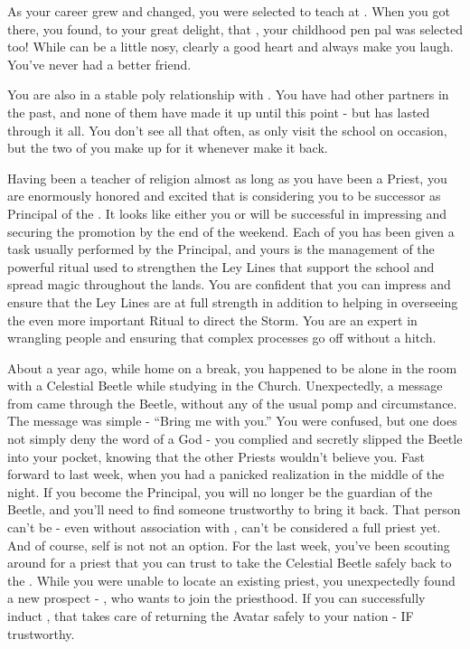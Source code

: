 \documentclass[char]{GL2020}
\begin{document}
As your career grew and changed, you were selected to teach at \pSchool{}. When you got there, you found, to your great delight, that \cMusic{}, your childhood pen pal was selected too! While \cMusic{} can be a little nosy, \cMusic{\they} clearly \cMusic{\have} a good heart and always make you laugh. You’ve never had a better friend.

You are also in a stable poly relationship with \cJuniorStatesman{}. You have had other partners in the past, and none of them have made it up until this point - but \cJuniorStatesman{} has lasted through it all. You don’t see \cJuniorStatesman{\them} all that often, as \cJuniorStatesman{\they} only visit \cJuniorStatesman{\plural} the school on occasion, but the two of you make up for it whenever \cJuniorStatesman{\they} \cJuniorStatesman{\does} make it back.

Having been a teacher of religion almost as long as you have been a Priest, you are enormously honored and excited that \cPrincipal{} is considering you to be \cPrincipal{\their} successor as Principal of the \pSchool{}.  It looks like either you or \cMusic{} will be successful in impressing \cPrincipal{} and securing the promotion by the end of the weekend.  Each of you has been given a task usually performed by the Principal, and yours is the management of the powerful ritual used to strengthen the Ley Lines that support the school and spread magic throughout the lands.  You are confident that you can impress \cPrincipal{} and ensure that the Ley Lines are at full strength in addition to helping \cPrincipal{} in overseeing the even more important Ritual to direct the Storm. You are an expert in wrangling people and ensuring that complex processes go off without a hitch.

About a year ago, while home on a break, you happened to be alone in the room with a Celestial Beetle while studying in the Church. Unexpectedly, a message from \cTechGod{} came through the Beetle, without any of the usual pomp and circumstance. The message was simple - “Bring me with you.” You were confused, but one does not simply deny the word of a God - you complied and secretly slipped the Beetle into your pocket, knowing that the other Priests wouldn’t believe you. Fast forward to last week, when you had a panicked realization in the middle of the night. If you become the Principal, you will no longer be the guardian of the Beetle, and you’ll need to find someone trustworthy to bring it back. That person can’t be \cScholarship{} - even without \cScholarship{\their} association with \cAntiChup{}, \cScholarship{\they} can’t be considered a full priest yet. And of course, \cAntiChup{} \cAntiChup{\them}self is not not an option. For the last week, you’ve been scouting around for a priest that you can trust to take the Celestial Beetle safely back to the \pTech{}. While you were unable to locate an existing priest, you unexpectedly found a new prospect - \cHeadScientist{}, who wants to join the priesthood. If you can successfully induct \cHeadScientist{}, that takes care of returning the Avatar safely to your nation - IF \cHeadScientist{\theyare} trustworthy.
\end{document}
